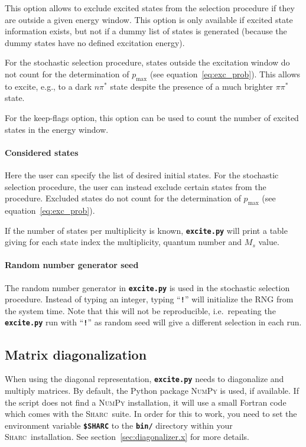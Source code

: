 \documentclass[a4paper,11pt,DIV=15,openany,twoside=false]{scrbook}
\newcommand{\sharc}{\textsc{Sharc}}
\newcommand{\ttt}[1]{\textbf{\texttt{#1}}}
\begin{document}
This option allows to exclude excited states from the selection procedure if they are outside a given energy window. This option is only available if excited state information exists, but not if a dummy list of states is generated (because the dummy states have no defined excitation energy).

For the stochastic selection procedure, states outside the excitation window do not count for the determination of $p_\text{max}$ (see equation~\eqref{eq:exc_prob}). This allows to excite, e.g., to a dark $n\pi^*$ state despite the presence of a much brighter $\pi\pi^*$ state.

For the keep-flags option, this option can be used to count the number of excited states in the energy window.

\paragraph{Considered states}

Here the user can specify the list of desired initial states. 
For the stochastic selection procedure, the user can instead exclude certain states from the procedure. Excluded states do not count for the determination of $p_\text{max}$ (see equation~\eqref{eq:exc_prob}).

If the number of states per multiplicity is known, \ttt{excite.py} will print a table giving for each state index the multiplicity, quantum number and $M_s$ value.


\paragraph{Random number generator seed}

The random number generator in \ttt{excite.py} is used in the stochastic selection procedure. Instead of typing an integer, typing ``\ttt{!}'' will initialize the RNG from the system time. Note that this will not be reproducible, i.e.\ repeating the \ttt{excite.py} run with ``\ttt{!}'' as random seed will give a different selection in each run.



\subsection{Matrix diagonalization}

When using the diagonal representation, \ttt{excite.py} needs to diagonalize and multiply matrices. By default, the Python package \textsc{NumPy} is used, if available. If the script does not find a \textsc{NumPy} installation, it will use a small Fortran code which comes with the \sharc\ suite. In order for this to work, you need to set the environment variable \ttt{\$SHARC} to the \ttt{bin/} directory within your \sharc\ installation. See section~\ref{sec:diagonalizer.x} for more details.
\end{document}
